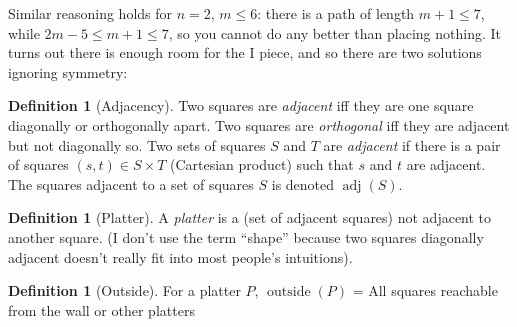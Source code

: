 \documentclass{article}
\theoremstyle{definition}%
\newtheorem{definition}[theorem]{Definition}
\newcommand{\newterm}[1]{\textit{#1}}
\newcommand{\adj}{\operatorname{adj}}
\newcommand{\outside}{\operatorname{outside}}
\begin{document}
Similar reasoning holds for $n = 2$, $m \le 6$: there is a path of length $m + 1 \le 7$, while $2m - 5 \le m + 1 \le 7$, so you cannot do any better than placing nothing. It turns out there is enough room for the I piece, and so there are two solutions ignoring symmetry:

\begin{figure}[htbp]
    \centering
    \label{fig:no2x5}
\end{figure}

\begin{definition}[Adjacency]
Two squares are \newterm{adjacent} iff they are one square diagonally or orthogonally apart. Two squares are \newterm{orthogonal} iff they are adjacent but not diagonally so. Two sets of squares $S$ and $T$ are \newterm{adjacent} if there is a pair of squares $(s, t) \in S \times T$ (Cartesian product) such that $s$ and $t$ are adjacent. The squares adjacent to a set of squares $S$ is denoted $\adj(S)$.
\end{definition}

\begin{definition}[Platter]
A \newterm{platter} is a (set of adjacent squares) not adjacent to another square. (I don't use the term ``shape'' because two squares diagonally adjacent doesn't really fit into most people's intuitions).%
\end{definition}

\begin{definition}[Outside]
For a platter $P$, $\outside(P)$ = All squares reachable from the wall or other platters
\end{definition}
\end{document}

